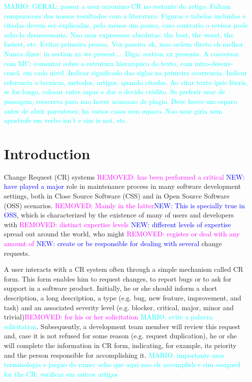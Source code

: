 \documentclass[10pt, conference]{IEEEtran}
\newcommand{\mario}[1]{\noindent\textcolor{cyan}{MARIO: {#1}}}
\newcommand{\rem}[1]{\noindent\textcolor{magenta}{REMOVED: {#1}}}
\newcommand{\new}[1]{\noindent\textcolor{blue}{NEW: {#1}}}
\newcommand{\mario}[1]{}
\newcommand{\rem}[1]{}
\newcommand{\new}[1]{#1}
\begin{document}
\mario{GERAL: passar a usar acronimo CR no restante do artigo. Faltam comparacoes dos nossos resultados com a literatura. Figuras e tabelas incluidas e citadas devem ser explicadas, pelo menos um pouco, caso contrario o revisor pode acha-la desnecessaria. Nao usar expressoes absolutas: the best, the worst, the fastest, etc. Evitar primeira pessoa. Voz passiva ok, mas ordem direta eh melhor.  Nunca dizer: in section xx we present.... Diga: section xx presents. A conversar com MC: comentar sobre a estrutura hierarquica do texto, com intro-desenv-concl, em cada nivel. Indicar significado das siglas na primeira ocorrencia. Indicar referencia a tecnicas, metodos, artigos, quando citados. Ao citar texto ipsis literis, se for longo, colocar entre aspas e dar o devido crédito. Se preferir usar de passagem, reescreva para nao haver acusacao de plagio. Deve haver um espaco antes de abrir parenteses; ha varios casos sem espaco.  Nao usar giria nem apostrofe em verbo isn't e sim is not, etc.}


\section{Introduction}
Change Request (CR) systems \rem{has been performed a critical} \new{have played a major} role in maintenance process in many software development settings, both in Close Source Software (CSS) and in Open Source Software (OSS) scenarios. \rem{Mainly in the latter}\new{This is specially true in OSS}, which is characterized by the existence of many of users and developers with \rem{distinct expertise levels} \new{different levels of expertise} spread out around the world, who might \rem{register or deal with any amount of} \new{create or be responsible for dealing with several} change requests\cite{Cavalcanti2014}. 

A user interacts with a CR system often through a simple mechanism called CR form. This form enables him to request changes, to report bugs or to ask for support in a software product\cite{Sommerville2010}. Initially, he or she should inform a short description, a long description, a type (e.g. bug, new feature, improvement, and task) and an associated severity level (e.g. blocker, critical, major, minor and trivial)\rem{ for his or her solicitation} \mario{evite a palavra solicitation}. Subsequently, a development team member will review this request and, case it is not refused for some reason (e.g. request duplication), he or she will complete the information in CR form, indicating, for example, its priority and the person responsible for accomplishing it. \mario{importante usar terminologia e jargao do ramo: acho que aqui nao eh accomplish e sim assigned for the CR; verificar em outros artigos}
\end{document}

